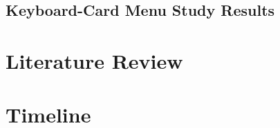 \documentclass[11pt]{amsart}
\begin{document}
\subsection{Keyboard-Card Menu Study Results}

\section{Literature Review}



\section{Timeline}




\end{document}
